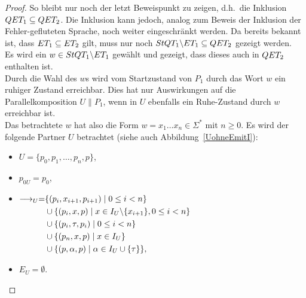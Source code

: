 \begin{proof}
  So bleibt nur noch der letzt Beweispunkt zu zeigen, d.h.\ die Inklusion $QET
  _1\subseteq QET _2$. Die Inklusion kann jedoch, analog zum Beweis der
  Inklusion der Fehler-gefluteten Sprache, noch weiter
  eingeschränkt werden. Da bereits bekannt ist, dass $ET _1\subseteq ET _2$
  gilt, muss nur noch $StQT _1\backslash ET _1\subseteq QET _2$ gezeigt
  werden.\\
  Es wird ein $w\in StQT _1\backslash ET _1$ gewählt und gezeigt, dass dieses
  auch in $QET _2$ enthalten ist.\\
  Durch die Wahl des $w$s wird vom Startzustand von $P_1$ durch das Wort $w$
  ein ruhiger Zustand erreichbar. Dies hat nur Auswirkungen auf die
  Parallelkomposition $U\|P_1$, wenn in $U$ ebenfalls ein Ruhe-Zustand durch
  $w$ erreichbar ist.\\
  Das betrachtete $w$ hat also die Form $w=x_1\dots x_n\in\Sigma ^*$ mit $n\geq
  0$. Es wird der folgende Partner $U$ betrachtet (siehe auch
  Abbildung~\ref{UohneEmitI}):
  \begin{itemize}
    \item $U=\{p_0,p_1,\dots ,p_n, p\}$,
    \item $p_{0U}=p_0$,
    \item $\begin{aligned}[t]
        \must _U=&\{(p_i,x_{i+1},p_{i+1})\mid  0\leq i< n\}\\
        &\cup\{(p_i,x,p)\mid  x\in I_U\backslash\{x_{i+1}\}, 0\leq i< n\}\\
        &\cup\{(p_i,\tau,p_i)\mid 0\leq i< n\}\\
        &\cup\{(p_n,x,p)\mid x\in I_U\}\\
        &\cup\{(p,\alpha,p)\mid \alpha\in I_U\cup\{\tau\}\},
    \end{aligned}$
    \item $E_U=\emptyset$.
  \end{itemize}
  \begin{figure} [h!tbp]
  \begin{center}
\end{center}
\end{figure}
\end{proof}

